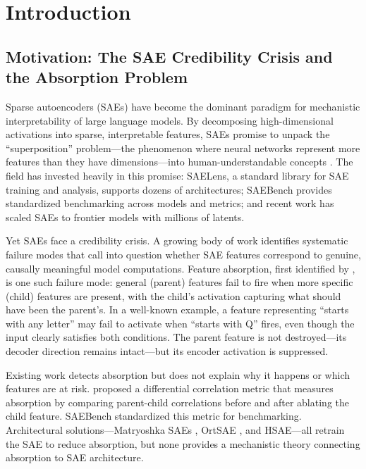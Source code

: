 \documentclass{article}
\begin{document}
\section{Introduction}

\subsection{Motivation: The SAE Credibility Crisis and the Absorption Problem}

Sparse autoencoders (SAEs) have become the dominant paradigm for mechanistic interpretability of large language models. By decomposing high-dimensional activations into sparse, interpretable features, SAEs promise to unpack the ``superposition'' problem---the phenomenon where neural networks represent more features than they have dimensions---into human-understandable concepts \citep{bricken2023towards, cunningham2023sparse, templeton2024scaling}. The field has invested heavily in this promise: SAELens, a standard library for SAE training and analysis, supports dozens of architectures; SAEBench provides standardized benchmarking across models and metrics; and recent work has scaled SAEs to frontier models with millions of latents.

Yet SAEs face a credibility crisis. A growing body of work identifies systematic failure modes that call into question whether SAE features correspond to genuine, causally meaningful model computations. Feature absorption, first identified by \citet{chanin2024quantifying}, is one such failure mode: general (parent) features fail to fire when more specific (child) features are present, with the child's activation capturing what should have been the parent's. In a well-known example, a feature representing ``starts with any letter'' may fail to activate when ``starts with Q'' fires, even though the input clearly satisfies both conditions. The parent feature is not destroyed---its decoder direction remains intact---but its encoder activation is suppressed.

Existing work detects absorption but does not explain why it happens or which features are at risk. \citet{chanin2024quantifying} proposed a differential correlation metric that measures absorption by comparing parent-child correlations before and after ablating the child feature. SAEBench \citep{karvonen2025saebench} standardized this metric for benchmarking. Architectural solutions---Matryoshka SAEs \citep{bussmann2025matryoshka}, OrtSAE \citep{korznikov2025ort}, and HSAE---all retrain the SAE to reduce absorption, but none provides a mechanistic theory connecting absorption to SAE architecture.
\end{document}
